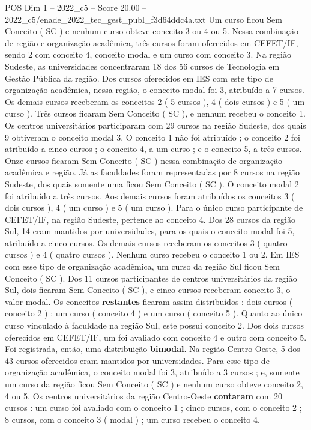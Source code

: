 \begin{textsample}{POS Dim 1 – 2022\_c5 – Score 20.00 – 2022\_c5/enade\_2022\_tec\_gest\_publ\_f3d64ddc4a.txt}
Um curso ficou Sem Conceito ( SC ) e nenhum curso obteve conceito 3 ou 4 ou 5.
Nessa combinação de região e organização acadêmica, três cursos foram oferecidos em CEFET/IF, sendo 2 com conceito 4, conceito modal e um curso com conceito 3.
Na região Sudeste, as universidades concentraram 18 dos 56 cursos de Tecnologia em Gestão Pública da região.
Dos cursos oferecidos em IES com este tipo de organização acadêmica, nessa região, o conceito modal foi 3, atribuído a 7 cursos.
Os demais cursos receberam os conceitos 2 ( 5 cursos ), 4 ( dois cursos ) e 5 ( um curso ).
Três cursos ficaram Sem Conceito ( SC ), e nenhum recebeu o conceito 1.
Os centros universitários participaram com 29 cursos na região Sudeste, dos quais 9 obtiveram o conceito modal 3.
O conceito 1 não foi atribuído ; o conceito 2 foi atribuído a cinco cursos ; o conceito 4, a um curso ; e o conceito 5, a três cursos.
Onze cursos ficaram Sem Conceito ( SC ) nessa combinação de organização acadêmica e região.
Já as faculdades foram representadas por 8 cursos na região Sudeste, dos quais somente uma ficou Sem Conceito ( SC ).
O conceito modal 2 foi atribuído a três cursos.
Aos demais cursos foram atribuídos os conceitos 3 ( dois cursos ), 4 ( um curso ) e 5 ( um curso ).
Para o único curso participante de CEFET/IF, na região Sudeste, pertence ao conceito 4.
Dos 28 cursos da região Sul, 14 eram mantidos por universidades, para os quais o conceito modal foi 5, atribuído a cinco cursos.
Os demais cursos receberam os conceitos 3 ( quatro cursos ) e 4 ( quatro cursos ).
Nenhum curso recebeu o conceito 1 ou 2.
Em IES com esse tipo de organização acadêmica, um curso da região Sul ficou Sem Conceito ( SC ).
Dos 11 cursos participantes de centros universitários da região Sul, dois ficaram Sem Conceito ( SC ), e cinco cursos receberam conceito 3, o valor modal.
Os conceitos \textbf{restantes} ficaram assim distribuídos : dois cursos ( conceito 2 ) ; um curso ( conceito 4 ) e um curso ( conceito 5 ).
Quanto ao único curso vinculado à faculdade na região Sul, este possui conceito 2.
Dos dois cursos oferecidos em CEFET/IF, um foi avaliado com conceito 4 e outro com conceito 5.
Foi registrada, então, uma distribuição \textbf{bimodal}.
Na região Centro-Oeste, 5 dos 43 cursos oferecidos eram mantidos por universidades.
Para esse tipo de organização acadêmica, o conceito modal foi 3, atribuído a 3 cursos ; e, somente um curso da região ficou Sem Conceito ( SC ) e nenhum curso obteve conceito 2, 4 ou 5.
Os centros universitários da região Centro-Oeste \textbf{contaram} com 20 cursos : um curso foi avaliado com o conceito 1 ; cinco cursos, com o conceito 2 ; 8 cursos, com o conceito 3 ( modal ) ; um curso recebeu o conceito 4.

\end{textsample}
